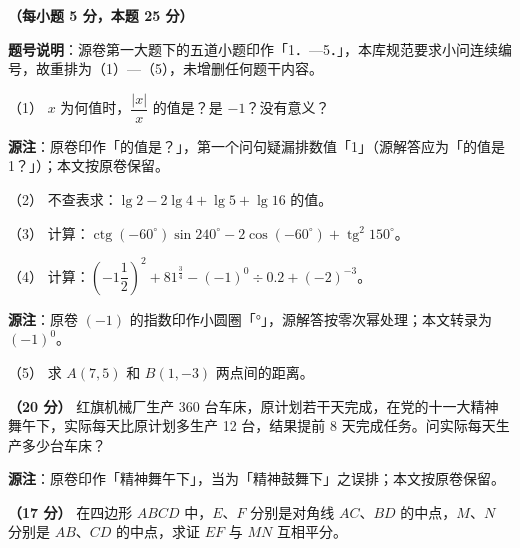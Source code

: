 \begin{question}
\textbf{（每小题 5 分，本题 25 分）} 

\begin{gktip}
\textbf{题号说明}：源卷第一大题下的五道小题印作「1．—5．」，本库规范要求小问连续编号，故重排为（1）—（5），未增删任何题干内容。
\end{gktip}

（1） $x$ 为何值时，$\dfrac{|x|}{x}$ 的值是？是 $-1$？没有意义？

\begin{gktip}
\textbf{源注}：原卷印作「的值是？」，第一个问句疑漏排数值「1」（源解答应为「的值是 1？」）；本文按原卷保留。
\end{gktip}

（2） 不查表求：$\lg 2-2\lg 4+\lg 5+\lg 16$ 的值。

（3） 计算：$\operatorname{ctg}(-60^\circ)\sin 240^\circ-2\cos(-60^\circ)+\operatorname{tg}^2 150^\circ$。

（4） 计算：$\left(-1\dfrac12\right)^2+81^{\frac34}-(-1)^0\div 0.2+(-2)^{-3}$。

\begin{gktip}
\textbf{源注}：原卷 $(-1)$ 的指数印作小圆圈「°」，源解答按零次幂处理；本文转录为 $(-1)^0$。
\end{gktip}

（5） 求 $A(7,5)$ 和 $B(1,-3)$ 两点间的距离。

\end{question}
\begin{question}
\textbf{（20 分）} 红旗机械厂生产 360 台车床，原计划若干天完成，在党的十一大精神舞午下，实际每天比原计划多生产 12 台，结果提前 8 天完成任务。问实际每天生产多少台车床？

\begin{gktip}
\textbf{源注}：原卷印作「精神舞午下」，当为「精神鼓舞下」之误排；本文按原卷保留。
\end{gktip}

\Needspace{0.4\textheight}
\end{question}
\begin{question}
\textbf{（17 分）} 在四边形 $ABCD$ 中，$E\text{、}F$ 分别是对角线 $AC\text{、}BD$ 的中点，$M\text{、}N$ 分别是 $AB\text{、}CD$ 的中点，求证 $EF$ 与 $MN$ 互相平分。
\nopagebreak[4]
\begin{center}\end{center}
\nopagebreak[4]
\Needspace{0.4\textheight}
\end{question}
